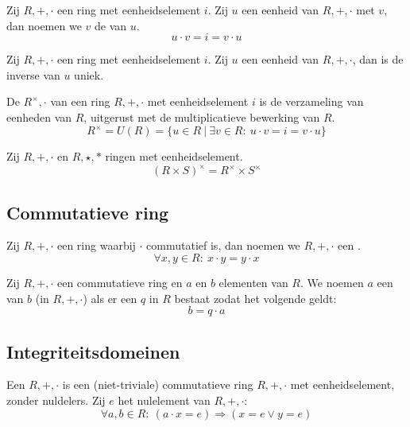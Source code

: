 \documentclass[main.tex]{subfiles}
\begin{document}
\begin{de}
  Zij $R,+,\cdot$ een ring met eenheidselement $i$.
  Zij $u$ een eenheid van $R,+,\cdot$ met $v$, dan noemen we $v$ de  van $u$.
  \[ u \cdot v = i = v \cdot u \]
\end{de}

\begin{st}
  Zij $R,+,\cdot$ een ring met eenheidselement $i$.
  Zij $u$ een eenheid van $R,+,\cdot$, dan is de inverse van $u$ uniek.
\end{st}

\begin{de}
  De  $R^{\times},\cdot$ van een ring $R,+,\cdot$ met eenheidselement $i$ is de verzameling van eenheden van $R$, uitgerust met de multiplicatieve bewerking van $R$.
  \[ R^{\times} = U(R) = \{ u \in R \ |\ \exists v \in R:\ u \cdot v = i = v \cdot u \} \]
\end{de}

\begin{st}
  Zij $R,+,\cdot$ en $R,\star,*$ ringen met eenheidselement.
  \[ (R \times S)^{\times} = R^{\times}\times S^{\times} \]
\end{st}

\subsection{Commutatieve ring}
\label{sec:commutatieve-rin}

\begin{de}
  Zij $R,+,\cdot$ een ring waarbij $\cdot$ commutatief is, dan noemen we $R,+,\cdot$ een .
  \[ \forall x,y \in R:\ x\cdot y = y \cdot x \]
\end{de}

\begin{de}
  Zij $R,+,\cdot$ een commutatieve ring en $a$ en $b$ elementen van $R$.
  We noemen $a$ een  van $b$ (in $R,+,\cdot$) als er een $q$ in $R$ bestaat zodat het volgende geldt:
  \[ b = q \cdot a \]
\end{de}

\subsection{Integriteitsdomeinen}
\label{sec:integriteitsdomeinen}

\begin{de}
  Een  $R,+,\cdot$ is een (niet-triviale) commutatieve ring $R,+,\cdot$ met eenheidselement, zonder nuldelers.
  Zij $e$ het nulelement van $R,+,\cdot$:
  \[ \forall a, b \in R:\ (a \cdot x = e) \Rightarrow (x = e \vee y = e) \]
\end{de}
\end{document}
